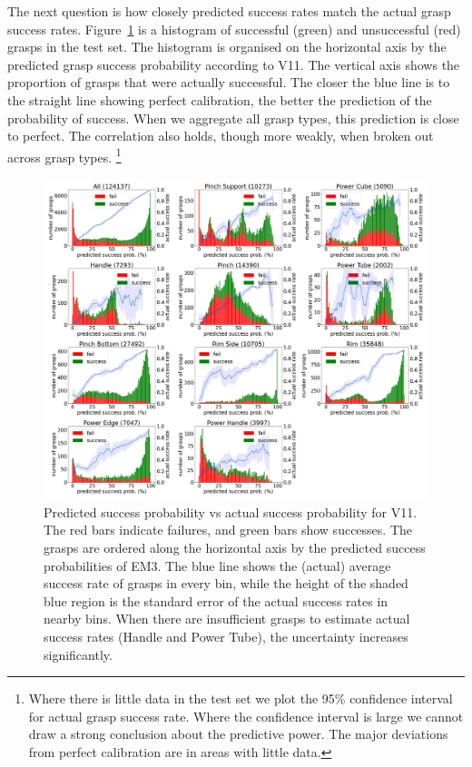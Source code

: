 The next question is how closely predicted success rates match the actual grasp success rates. Figure~\ref{fig:calibrate} is a histogram of successful (green) and unsuccessful (red) grasps in the test set. The histogram is organised on the horizontal axis by the predicted grasp success probability according to V11. The vertical axis shows the proportion of grasps that were actually successful. The closer the blue line is to the straight line showing perfect calibration, the better the prediction of the probability of success. When we aggregate all grasp types, this prediction is close to perfect. The correlation also holds, though more weakly, when broken out across grasp types. \footnote{Where there is little data in the test set we plot the 95\% confidence interval for actual grasp success rate. Where the confidence interval is large we cannot draw a strong conclusion about the predictive power. The major deviations from perfect calibration are in areas with little data.}

\begin{figure}[h]
\centering
\includegraphics[width=1.02\columnwidth]{images/post-analysis/V11_pred_success_vs_success.png}
\caption{Predicted success probability vs actual success probability for V11. The red bars indicate failures, and green bars show successes. The grasps are ordered along the horizontal axis by the predicted success probabilities of EM3. The blue line shows the (actual) average success rate of grasps in every bin, while the height of the shaded blue region is the standard error of the actual success rates in nearby bins. When there are insufficient grasps to estimate actual success rates (Handle and Power Tube), the uncertainty increases significantly.}
\label{fig:calibrate}
\end{figure}

